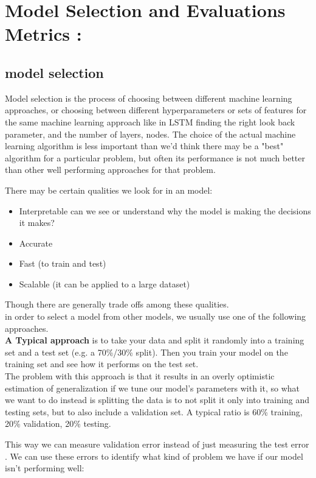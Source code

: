 
\chapter{Model Selection and Evaluations Metrics :}\label{descriptors}

\section{model selection}\label{variance_bias}
Model selection is the process of choosing between different machine learning approaches,  or choosing between different hyperparameters or sets of features for the same machine learning approach  like in LSTM  finding the right look back parameter, and the number of layers, nodes.
The choice of the actual machine learning algorithm is less important than we'd think  there may be a "best" algorithm for a particular problem, but often its performance is not much better than other well performing approaches for that problem.

There may be certain qualities we look for in an model:
\begin{itemize}
\item Interpretable   can we see or understand why the model is making the decisions it makes?
\item Accurate
\item Fast (to train and test)
\item Scalable (it can be applied to a large dataset)
\end{itemize}
Though there are generally trade offs among these qualities.\\in order to select a model from other models, we usually use one of the following approaches.\\\textbf{A Typical approach } is to take your data and split it randomly into a training set and a test set (e.g. a 70\%/30\% split). Then you train your model on the training set and see how it performs on the test set.\\The problem with this approach is that it results in an overly optimistic estimation of generalization if we tune our model's parameters with it,  so what we want to do instead is splitting the data is to not split it only into training and testing sets, but to also include a validation set. A typical ratio is 60\% training, 20\% validation, 20\% testing.

This way we can measure validation error instead of just measuring the test error .
We can use these errors   to identify what kind of problem we have if our model isn't performing well:

